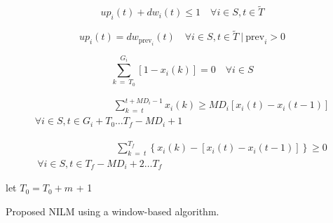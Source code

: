 \begin{algorithm}[htb]
{\begin{equation}
up_i(t) + dw_i(t) \leq 1 \quad \forall i \in S, t \in \tilde{T}
\end{equation}

\begin{equation}
    up_i(t) = dw_{\text{prev}_i}(t) \quad \forall i \in S, t \in \tilde{T} \ | \ \text{prev}_i>0
\end{equation}

\begin{equation}
    \sum_{k\ =\ T_0}^{G_i} \left[ 1 - x_i(k) \right] = 0 \quad \forall i \in S
\end{equation}

\begin{multline}
 \qquad \qquad \qquad \qquad    \sum_{k\ =\ t}^{t+MD_i-1} x_i(k) \geq MD_i \left[ x_i(t) - x_i(t-1) \right] \\
    \forall i \in S, t \in G_i + T_0 \hdots T_f - {MD}_i + 1
\end{multline}

\begin{multline}
 \qquad \qquad \qquad \qquad \sum_{k\ =\ t}^{T_f} \left\{ x_i(k) - \left[ x_i(t) - x_i(t-1) \right] \right\} \geq 0 \\
    \forall i \in S, t \in T_f - MD_i + 2 \hdots T_f
\end{multline}
 

let $T_0 = T_0 +m$ + 1
 }
\caption{Proposed NILM using a window-based algorithm.}
\end{algorithm}
